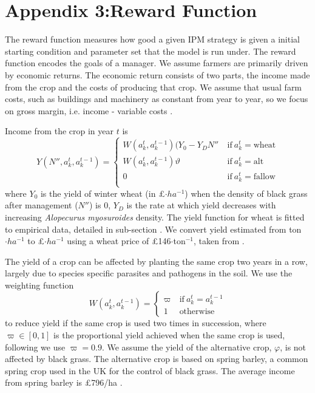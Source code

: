 \documentclass[12pt, a4paper]{article}
\begin{document}
\section*{Appendix 3:Reward Function}
The reward function measures how good a given IPM strategy is given a initial starting condition and parameter set that the model is run under. The reward function encodes the goals of a manager. We assume farmers are primarily driven by economic returns. The economic return consists of two parts, the income made from the crop and the costs of producing that crop. We assume that usual farm costs, such as buildings and machinery as constant from year to year, so we focus on gross margin, i.e. income - variable costs \citep[pp.~3]{Nix2016}.

Income from the crop in year $t$ is    
\begin{equation}\label{eq:yield}
	Y(N'', a_k^t, a_k^{t-1}) = \begin{cases} 
		W(a_k^t, a_k^{t-1})(Y_0 - Y_D N'' &~\text{if}~a_k^t = \text{wheat}\\
		W(a_k^t, a_k^{t-1})\vartheta &~\text{if}~a_k^t = \text{alt}\\
		0 &~\text{if}~a_k^t = \text{fallow}\\
	\end{cases}
\end{equation}   
where $Y_0$ is the yield of winter wheat (in \pounds $\cdot ha^{-1}$) when the density of black grass after management ($N''$) is 0, $Y_D$ is the rate at which yield decreases with increasing \textit{Alopecurus myosuroides} density. The yield function for wheat is fitted to empirical data, detailed in sub-section \textit{}. We convert yield estimated from ton$\cdot ha^{-1}$ to \pounds $\cdot ha^{-1}$ using a wheat price of \pounds 146$\cdot$ton$^{-1}$, taken from \citet[pp.~9]{Nix2016}. 

The yield of a crop can be affected by planting the same crop two years in a row, largely due to species specific parasites and pathogens in the soil. We use the weighting function 
\begin{equation}
	W(a_k^t, a_k^{t-1}) = \begin{cases}
		\varpi &~\text{if}~a_k^t = a_k^{t-1}\\
		1 &~\text{otherwise}
	\end{cases}
\end{equation} 
to reduce yield if the same crop is used two times in succession, where $\varpi \in [0, 1]$ is the proportional yield achieved when the same crop is used, following we use $\varpi = 0.9$. We assume the yield of the alternative crop, $\varphi$, is not affected by black grass. The alternative crop is based on spring barley, a common spring crop used in the UK for the control of black grass. The average income from spring barley is \pounds 796/ha \citep[pp.~12]{Nix2016}.   
\end{document}
